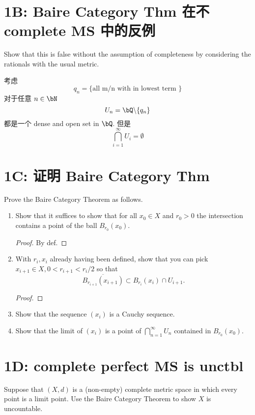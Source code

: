 \documentclass[lang=cn,11pt]{template}
\begin{document}
\section*{1B: Baire Category Thm 在不 complete MS 中的反例}
Show that this is false without the assumption of completeness by considering the rationals with the usual metric. 
\begin{solution}
    考虑 
    $$
    {q_n} = \{ \text{all m/n with in lowest term } \}  $$
对于任意 $n \in \bN$
    $$
    U_n = \bQ \backslash \{q_n\}
    $$ 都是一个 dense and open set in $\bQ$. 但是
    $$
    \bigcap_ {i = 1} ^ \infty U_i = \emptyset
    $$
\end{solution}

\section*{1C: 证明 Baire Category Thm}

Prove the Baire Category Theorem as follows. 

\begin{enumerate} 
\item Show that it suffices to show that for all $x_0\in X$ and $r_0>0$ the intersection contains a point of the ball $B_{r_0}(x_0)$. 
\begin{proof}
    By def.
\end{proof}
\item With $r_i, x_i$ already having been defined, show that you can pick $x_{i+1} \in X, 0< r_{i+1}< r_i/2$ so that 
$$\overline{B_{r_{i+1}} (x_{i+1})} \subset B_{r_i}(x_i) \cap U_{i+1}.$$
\begin{proof}
    
\end{proof}
\item Show that the sequence $(x_i)$ is a Cauchy sequence. 
\item Show that the limit of $(x_i)$ is a point of $\bigcap_{n=1}^\infty U_n$ contained in $B_{r_0}(x_0)$.
\end{enumerate}

\section*{1D: complete perfect MS is unctbl}

Suppose that $(X,d)$ is a (non-empty) complete metric space in which every point is a limit point. Use the Baire Category Theorem to show $X$ is uncountable. 

\newpage
\end{document}

